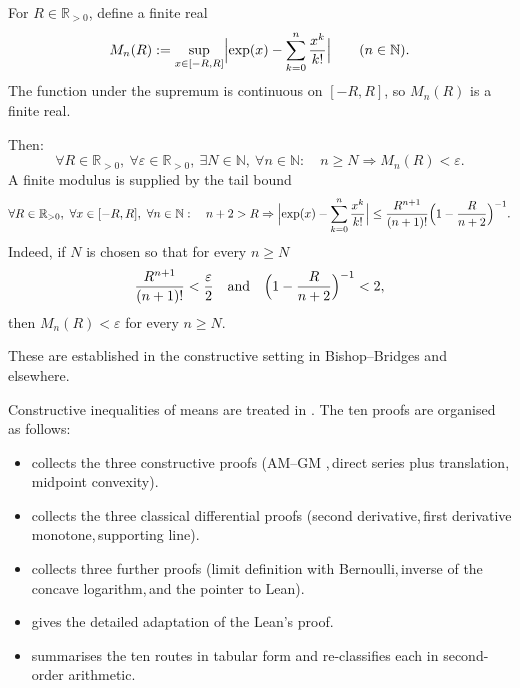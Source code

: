 \documentclass[11pt,reqno]{amsart}
\makeatletter
\providecommand{\R}{\mathbb{R}}
\providecommand{\N}{\mathbb{N}}
\theoremstyle{redplain}
\providecommand{\comma}{,\,}
\renewenvironment{quotation}
{\list{}{\listparindent\z@
		\itemindent\z@
		\rightmargin\leftmargin
		\parsep\z@}	\item\relax}
{\endlist}
\numberwithin{equation}{section}
\makeatother
\begin{document}
\begin{quotation}
\label{Uniformconvergence}For $R\in \R_{>0}$, define a finite real 
\begin{equation*}
M_{n}(R):=\sup_{x\in [-R,R]}\Bigl|\exp (x)-\sum_{k=0}^{n}\frac{x^{k}}{k!}%
\Bigr|\qquad (n\in \N).
\end{equation*}
The function under the supremum is continuous on $[-R,R]$, so $M_n(R)$ is a
finite real.

Then: 
\begin{equation*}
\forall R\in \R_{>0},\ \forall \varepsilon \in \R_{>0},\ \exists N\in \N,\
\forall n\in \N:\quad n\geq N\Rightarrow M_{n}(R)<\varepsilon .
\end{equation*}%
A finite modulus is supplied by the tail bound 
\begin{equation*}
\forall R\in \R_{>0},\ \forall x\in [-R,R],\ \forall n\in \N:\quad
n+2>R\Rightarrow \Bigl|\exp (x)-\sum_{k=0}^{n}\frac{x^{k}}{k!}\Bigr|\leq 
\frac{R^{n+1}}{(n+1)!}\Bigl(1-\frac{R}{n+2}\Bigr)^{-1}.
\end{equation*}
Indeed, if $N$ is chosen so that for every $n\ge N$ 
\begin{equation*}
\frac{R^{n+1}}{(n+1)!}<\frac{\varepsilon}{2} \quad\text{and}\quad \Bigl(1-%
\frac{R}{n+2}\Bigr)^{-1}<2,
\end{equation*}
then $M_{n}(R)<\varepsilon$ for every $n\ge N$.

\noindent These are established in the constructive setting in
Bishop--Bridges \cite{BishopBridges1985} and elsewhere.

Constructive inequalities of means are treated in \cite{Kawakubo2026}.%
\newline
\noindent The ten proofs are organised as follows:
\end{quotation}

\begin{itemize}
\item {} collects the three constructive proofs (AM--GM%
\comma direct series plus translation, midpoint convexity).

\item {} collects the three classical differential proofs
(second derivative\comma first derivative monotone\comma supporting line).

\item {} collects three further proofs (limit definition
with Bernoulli\comma inverse of the concave logarithm\comma and the pointer
to Lean).

\item {} gives the detailed adaptation of the Lean's proof.

\item {} summarises the ten routes in tabular form and
re-classifies each in second-order arithmetic.
\end{itemize}
\end{document}
